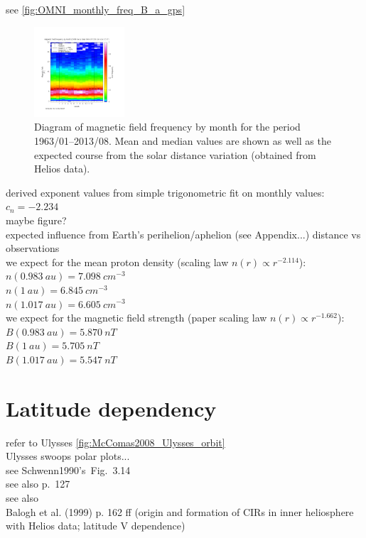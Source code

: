 see \autoref{fig:OMNI_monthly_freq_B_a_gps}
\begin{figure}[htb]
	\centering
	\includegraphics[width=0.3\textwidth]{figures_of_mine/gnuplots/OMNI_monthly_freq_B_a_gps.png}
	\caption{Diagram of magnetic field frequency by month for the period 1963/01--2013/08. Mean and median values are shown as well as the expected course from the solar distance variation (obtained from Helios data).}
	\label{fig:OMNI_monthly_freq_B_a_gps}
\end{figure}

derived exponent values from simple trigonometric fit on monthly values:\\
$c_n = -2.234$\\
maybe figure?\\

expected influence from Earth's perihelion/aphelion (see Appendix...) distance vs observations\\
we expect for the mean proton density (scaling law $n(r) \propto r^{-2.114}$):\\
$n(0.983~au) = 7.098~cm^{-3}$\\
$n(1~au) = 6.845~cm^{-3}$\\
$n(1.017~au) = 6.605~cm^{-3}$\\
we expect for the magnetic field strength (paper scaling law $n(r) \propto r^{-1.662}$):\\
$B(0.983~au) = 5.870~nT$\\
$B(1~au) = 5.705~nT$\\
$B(1.017~au) = 5.547~nT$\\


\section{Latitude dependency}
refer to Ulysses \autoref{fig:McComas2008_Ulysses_orbit}\\
Ulysses swoops polar plots...\\

see Schwenn1990's~Fig.~3.14\\
see also \citet{Schwenn1990} p.~127\\
see also \citet{Richardson1995}\\
Balogh et al. (1999) p. 162 ff (origin and formation of CIRs in inner heliosphere with Helios data; latitude V dependence)\\

